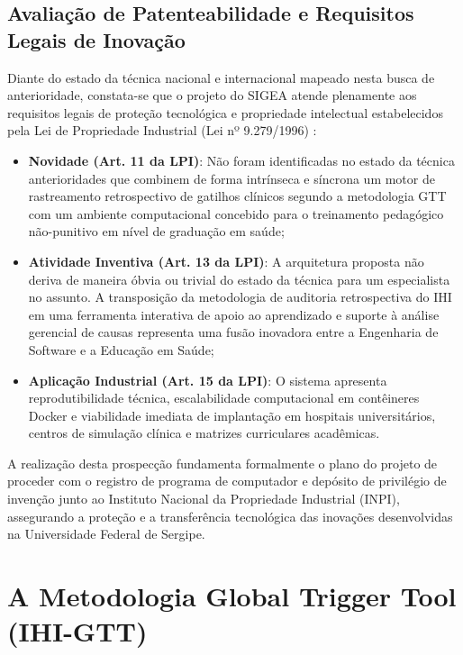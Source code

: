\subsection{Avaliação de Patenteabilidade e Requisitos Legais de Inovação}
\label{subsec:requisitos-patenteabilidade}

Diante do estado da técnica nacional e internacional mapeado nesta busca de anterioridade, constata-se que o projeto do SIGEA atende plenamente aos requisitos legais de proteção tecnológica e propriedade intelectual estabelecidos pela Lei de Propriedade Industrial (Lei nº 9.279/1996) \cite{brasil1996lpi}:

\begin{itemize}
    \item \textbf{Novidade (Art. 11 da LPI)}: Não foram identificadas no estado da técnica anterioridades que combinem de forma intrínseca e síncrona um motor de rastreamento retrospectivo de gatilhos clínicos segundo a metodologia GTT com um ambiente computacional concebido para o treinamento pedagógico não-punitivo em nível de graduação em saúde;
    \item \textbf{Atividade Inventiva (Art. 13 da LPI)}: A arquitetura proposta não deriva de maneira óbvia ou trivial do estado da técnica para um especialista no assunto. A transposição da metodologia de auditoria retrospectiva do IHI em uma ferramenta interativa de apoio ao aprendizado e suporte à análise gerencial de causas representa uma fusão inovadora entre a Engenharia de Software e a Educação em Saúde;
    \item \textbf{Aplicação Industrial (Art. 15 da LPI)}: O sistema apresenta reprodutibilidade técnica, escalabilidade computacional em contêineres Docker e viabilidade imediata de implantação em hospitais universitários, centros de simulação clínica e matrizes curriculares acadêmicas.
\end{itemize}

A realização desta prospecção fundamenta formalmente o plano do projeto de proceder com o registro de programa de computador e depósito de privilégio de invenção junto ao Instituto Nacional da Propriedade Industrial (INPI), assegurando a proteção e a transferência tecnológica das inovações desenvolvidas na Universidade Federal de Sergipe.

\section{A Metodologia Global Trigger Tool (IHI-GTT)}
\label{sec:metodologia-gtt}

